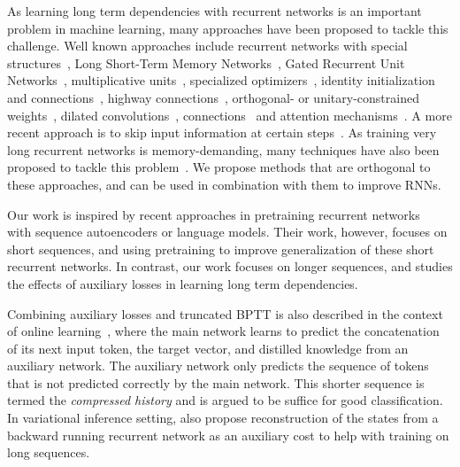 \documentclass{article}
\begin{document}
As learning long term dependencies with recurrent networks is an important problem in machine learning, many approaches have been proposed to tackle this challenge. Well known approaches include recurrent networks with special structures~\cite{el1996hierarchical,sperduti1997supervised,frasconi1998general,socher11,chan2016listen}, Long Short-Term Memory Networks~\cite{hochreiter1997long,gers1999learning,graves2013generating}, Gated Recurrent Unit Networks~\cite{cho2014learning,chung2014empirical}, multiplicative units~\cite{wu2016multiplicative}, specialized optimizers~\cite{martens2011learning,kingma2014adam}, identity initialization and connections~\cite{mikolov2014learning,le2015simple,he2016deep}, highway connections~\cite{zilly2016recurrent}, orthogonal- or unitary-constrained weights~\cite{white2004short,henaff2016recurrent,arjovsky2016unitary}, dilated convolutions~\citep{salimans2017pixelcnn++}, connections~\cite{koutnik2014clockwork} and attention mechanisms~\citep{bahdanau2014neural,luong2015effective,vaswani2017attention}. A more recent approach is to skip input information at certain steps~\cite{yu2017learning,seo2017neural,campos2017skip}. As training very long recurrent networks is memory-demanding, many techniques have also been proposed to tackle this problem~\cite{chen2016training,gruslys2016memory,Jaderberg16synthGrad}. We propose methods that are orthogonal to these approaches, and can be used in combination with them to improve RNNs. 

Our work is inspired by recent approaches in pretraining recurrent networks~\cite{dai2015semi,ramachandran2016unsupervised} with sequence autoencoders or language models. Their work, however, focuses on short sequences, and using pretraining to improve generalization of these short recurrent networks. In contrast, our work focuses on longer sequences, and studies the effects of auxiliary losses in learning long term dependencies.

Combining auxiliary losses and truncated BPTT is also described in the context of online learning~\cite{schmidhuber1992learning}, where the main network learns to predict the concatenation of its next input token, the target vector, and distilled knowledge from an auxiliary network. The auxiliary network only predicts the sequence of tokens that is not predicted correctly by the main network. This shorter sequence is termed the {\it compressed history} and is argued to be suffice for good classification. In variational inference setting, \cite{goyal2017z} also propose reconstruction of the states from a backward running recurrent network as an auxiliary cost to help with training on long sequences.
\end{document}
